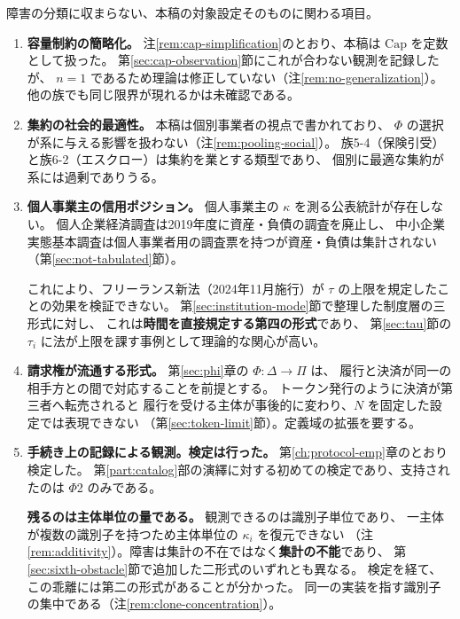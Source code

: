 障害の分類に収まらない、本稿の対象設定そのものに関わる項目。

\begin{enumerate}[label=(\arabic*),start=9]
\item \textbf{容量制約の簡略化。}
注\ref{rem:cap-simplification}のとおり、本稿は $\mathrm{Cap}$ を定数として扱った。
第\ref{sec:cap-observation}節にこれが合わない観測を記録したが、
$n=1$ であるため理論は修正していない（注\ref{rem:no-generalization}）。
他の族でも同じ限界が現れるかは未確認である。

\item \textbf{集約の社会的最適性。}
本稿は個別事業者の視点で書かれており、
$\Phi$ の選択が系に与える影響を扱わない（注\ref{rem:pooling-social}）。
族5-4（保険引受）と族6-2（エスクロー）は集約を業とする類型であり、
個別に最適な集約が系には過剰でありうる。

\item \textbf{個人事業主の信用ポジション。}
個人事業主の $\kappa$ を測る公表統計が存在しない。
個人企業経済調査は2019年度に資産・負債の調査を廃止し、
中小企業実態基本調査は個人事業者用の調査票を持つが資産・負債は集計されない
（第\ref{sec:not-tabulated}節）。

これにより、フリーランス新法（2024年11月施行）が
$\tau$ の上限を規定したことの効果を検証できない。
第\ref{sec:institution-mode}節で整理した制度層の三形式に対し、
これは\textbf{時間を直接規定する第四の形式}であり、
第\ref{sec:tau}節の $\tau_i$ に法が上限を課す事例として理論的な関心が高い。

\item \textbf{請求権が流通する形式。}
第\ref{sec:phi}章の $\Phi:\Delta\to\Pi$ は、
履行と決済が同一の相手方との間で対応することを前提とする。
トークン発行のように決済が第三者へ転売されると
履行を受ける主体が事後的に変わり、$N$ を固定した設定では表現できない
（第\ref{sec:token-limit}節）。定義域の拡張を要する。

\item \textbf{手続き上の記録による観測。検定は行った。}
第\ref{ch:protocol-emp}章のとおり検定した。
第\ref{part:catalog}部の演繹に対する初めての検定であり、支持されたのは $\Phi$2 のみである。

\textbf{残るのは主体単位の量である。}
観測できるのは識別子単位であり、
一主体が複数の識別子を持つため主体単位の $\kappa_i$ を復元できない
（注\ref{rem:additivity}）。障害は集計の不在ではなく\textbf{集計の不能}であり、
第\ref{sec:sixth-obstacle}節で追加した二形式のいずれとも異なる。
検定を経て、この乖離には第二の形式があることが分かった。
同一の実装を指す識別子の集中である（注\ref{rem:clone-concentration}）。


\end{enumerate}
